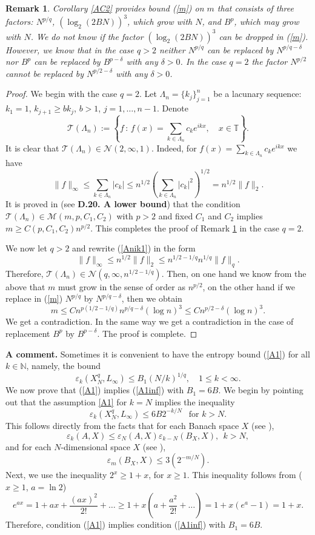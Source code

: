 \documentclass[12pt]{article}
\newcommand{\N}{{\mathbb{N}}}
\def \Tr{\mathcal T}
\def \cN{\mathcal N}
\def \cM{\mathcal M}
\def \T{\mathbb T}
\def \e{\varepsilon}
\newtheorem{Remark}{Remark}[section]
\numberwithin{equation}{section}
\newcommand{\be}{\begin{equation}}
\newcommand{\ee}{\end{equation}}
\begin{document}
\begin{Remark}\label{AR2} Corollary \ref{AC2} provides bound (\ref{m}) on $m$ that consists of
three factors: $N^{p/q}$, $(\log_2 (2BN))^3$, which grow with $N$, and $B^p$, which may grow with $N$.
We do not know if the factor $(\log_2 (2BN))^3$ can be dropped in (\ref{m}). However, we know that in the case 
$q>2$ neither $N^{p/q}$ can be replaced by $N^{p/q-\delta}$ nor $B^p$ can be replaced by $B^{p-\delta}$ with any $\delta>0$. In the case $q=2$ the factor $N^{p/2}$ cannot be replaced by $N^{p/2-\delta}$ with any $\delta>0$.
\end{Remark}
\begin{proof} We begin with the case $q=2$.  Let $\Lambda_n = \{k_j\}_{j=1}^n$ be a lacunary sequence: $k_1=1$, $k_{j+1} \ge bk_j$, $b>1$, $j=1,\dots,n-1$. Denote
$$
\Tr(\Lambda_n):= \left\{f\,:\, f(x) = \sum_{k\in \Lambda_n} c_ke^{ikx},\quad x\in\T \right\}.  
$$
It is clear that $\Tr(\Lambda_n) \in \cN(2,\infty,1)$. Indeed, for $f(x) = \sum_{k\in \Lambda_n} c_ke^{ikx}$ we have
\be\label{Anik1}
\|f\|_\infty \le \sum_{k\in \Lambda_n} |c_k| \le n^{1/2}\left(\sum_{k\in \Lambda_n} |c_k|^2\right)^{1/2} = n^{1/2}\|f\|_2.
\ee
It is proved in \cite{KKLT} (see {\bf D.20. A lower bound}) that the condition $\Tr(\Lambda_n) \in 
\cM(m,p,C_1,C_2)$ with $p>2$ and fixed $C_1$ and $C_2$ implies $ m\ge C(p,C_1,C_2) n^{p/2}$. 
This completes the proof of Remark \ref{AR2} in the case $q=2$. 

We now let $q>2$ and rewrite (\ref{Anik1}) in the form
$$
\|f\|_\infty \le n^{1/2}\|f\|_2 \le n^{1/2-1/q} n^{1/q}\|f\|_q.
$$
Therefore, $\Tr(\Lambda_n) \in \cN(q,\infty,n^{1/2-1/q})$. Then, on one hand we know from the above that 
$m$ must grow in the sense of order as $n^{p/2}$, on the other hand if we replace in (\ref{m}) $N^{p/q}$ by $N^{p/q-\delta}$, then we obtain 
$$
m \le C n^{p(1/2-1/q)}n^{p/q-\delta} (\log n)^3 \le Cn^{p/2-\delta}(\log n)^3.
$$
We get a contradiction. In the same way we get a contradiction in the case of replacement $B^p$  by $B^{p-\delta}$. The proof is complete.

\end{proof}


{\bf A comment.} Sometimes it is convenient to have the entropy bound  (\ref{A1}) for all $k\in \N$, 
namely, the bound
\be\label{A1inf}
\e_k(X^q_N,L_\infty) \le  B_1 (N/k)^{1/q}, \quad 1\leq k <\infty. 
\ee
We now prove that (\ref{A1}) implies (\ref{A1inf}) with $B_1=6B$.
We begin by pointing out that the assumption \eqref{A1} for $k=N$ implies the inequality
\begin{equation}\label{A12}
\e_k(X_N^q, L_\infty)\le 6B2^{-k/N}  \   \  \text{ for $k>N$}.
\end{equation}
This  follows directly  from the facts that for each Banach  space $X$ (see \cite[(7.1.6), p. 323]{VTbookMA}),
$$
\e_k(A,X) \le \e_N(A,X)\e_{k-N}(B_X,X), \  \ k>N,
$$
and for each $N$-dimensional space $X$ (see \cite[Corollary 7.2.2, p. 324]{VTbookMA}),
$$
\e_m(B_X,X) \le 3(2^{-m/N}).
$$
Next, we use the inequality $2^x\ge 1+x$, for $x\ge 1$. This inequality follows from ($x\ge 1$, $a=\ln 2$)
$$
e^{ax} = 1+ax+\frac{(ax)^2}{2!} +\dots \ge 1+x\left(a+\frac{a^2}{2!}+\dots\right) = 1+x(e^a-1) =1+x.
$$
Therefore, condition (\ref{A1}) implies condition (\ref{A1inf}) with $B_1= 6B$. 
 
\end{document}
